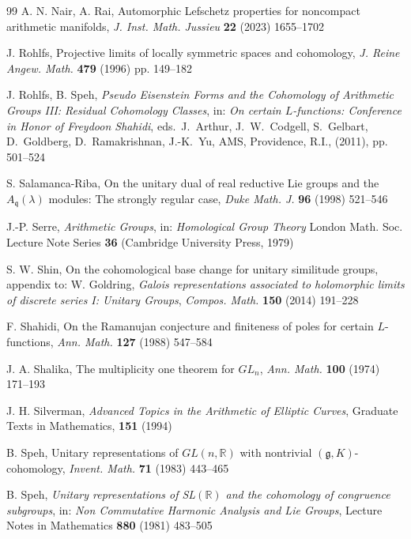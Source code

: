 \documentclass[a4paper,10pt]{amsart}
\theoremstyle{definition}
\numberwithin{equation}{section}
\def\R{\mathbb R}
\def\g{\mathfrak g}
\def\q{\mathfrak q}
\begin{document}
\begin{thebibliography}{99}
 A. N. Nair, A. Rai, Automorphic Lefschetz properties for noncompact arithmetic manifolds, {\it J. Inst. Math. Jussieu} {\bf 22} (2023) 1655--1702


 J. Rohlfs, Projective limits of locally symmetric spaces and cohomology, {\it J. Reine Angew. Math.} \textbf{479} (1996) pp. 149--182

 J. Rohlfs, B. Speh, {\it Pseudo Eisenstein Forms and the Cohomology of Arithmetic Groups III: Residual Cohomology Classes}, in: {\it On certain $L$-functions: Conference in Honor of Freydoon Shahidi}, eds.\ J.\ Arthur, J.\ W.\ Codgell, S.\ Gelbart, D.\ Goldberg, D.\ Ramakrishnan, J.-K.\ Yu, AMS, Providence, R.I., (2011), pp. 501--524


 S. Salamanca-Riba, On the unitary dual of real reductive Lie groups and the $A_\q(\lambda)$ modules: The strongly regular case, {\it Duke Math. J.} {\bf 96} (1998) 521--546


 J.-P. Serre, {\it Arithmetic Groups}, in: {\it Homological Group Theory} London Math. Soc. Lecture Note Series {\bf 36} (Cambridge University Press, 1979)


 S. W. Shin, On the cohomological base change for unitary similitude groups, appendix to: W. Goldring, {\it Galois representations associated to holomorphic limits of discrete series I: Unitary Groups}, {\it Compos. Math.} {\bf 150} (2014) 191--228

 F. Shahidi, On the Ramanujan conjecture and finiteness of poles for certain $L$-functions, {\it Ann. Math.} \textbf{127} (1988) 547--584

 J. A. Shalika, The multiplicity one theorem for $GL_n$, {\it Ann. Math.} \textbf{100} (1974) 171--193

 J. H. Silverman, \emph{Advanced Topics in the Arithmetic of Elliptic Curves}, Graduate Texts in Mathematics, {\bf 151} (1994)

 B. Speh, Unitary representations of $GL(n,\R)$ with nontrivial $(\g,K)$-cohomology, {\it Invent. Math.} {\bf 71} (1983) 443--465

 B. Speh, {\it Unitary representations of SL$(\R)$ and the cohomology of congruence subgroups}, in: {\it Non Commutative Harmonic Analysis and Lie Groups}, Lecture Notes in Mathematics {\bf 880} (1981) 483--505



\end{thebibliography}
\end{document}
